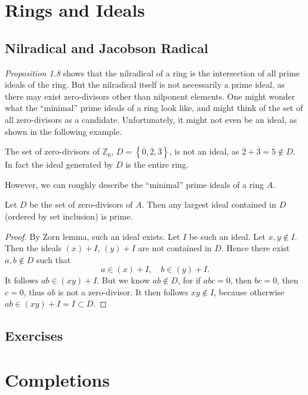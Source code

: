 \documentclass{note}
\begin{document}
\chapter{Rings and Ideals}

\section*{Nilradical and Jacobson Radical}
\textit{Proposition 1.8} shows that the nilradical of a ring is the
intersection of all prime ideals of the ring. But the nilradical itself is not
necessarily a prime ideal, as there may exist zero-divisors other than
nilponent elements. One might wonder what the ``minimal'' prime ideals of a
ring look like, and might think of the set of all zero-divisors as a candidate.
Unfortunately, it might not even be an ideal, as shown in the following
example.
\begin{example*}
  The set of zero-divisors of $\mathbb{Z}_6$, $D =
    \left\{\overline{0},\overline{2},\overline{3}\right\}$, is not an ideal, as
  $\overline{2}+\overline{3}=\overline{5} \notin D$. In fact the ideal generated
  by $D$ is the entire ring.
\end{example*}
However, we can roughly describe the ``minimal'' prime ideals of a ring $A$.
\begin{proposition*}
  Let $D$ be the set of zero-divisors of $A$. Then any largest ideal contained in
  $D$ (ordered by set inclusion) is prime.
\end{proposition*}
\begin{proof}
  By Zorn lemma, such an ideal exists. Let $I$ be such an ideal. Let $x,y\notin
    I$. Then the ideals $(x)+I$, $(y)+I$ are not contained in $D$. Hence there
  exist $a,b\notin D$ such that $$a\in (x)+I, \quad b\in(y)+I.$$ It follows
  $ab\in (xy) + I$. But we know $ab\notin D$, for if $abc=0$, then $bc=0$, then
  $c=0$, thus $ab$ is not a zero-divisor. It then follows $xy\notin I$, because
  otherwise $ab\in (xy) + I = I \subset D$.
\end{proof}

\section*{Exercises}
\setcounter{chapter}{9}

\chapter{Completions}
\end{document}
